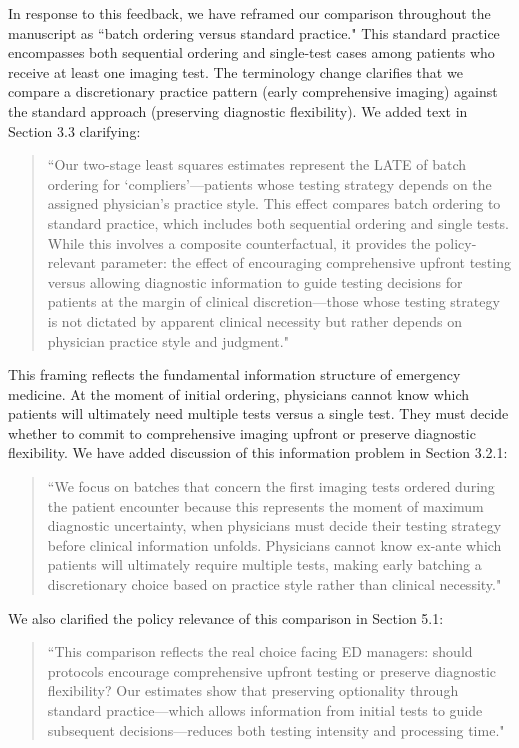 \documentclass[11pt]{article}
\newcommand{\1}{\hbox{\rm 1\kern-.35em 1}}
\begin{document}
{In response to this feedback, we have reframed our comparison throughout the manuscript as ``batch ordering versus standard practice." This standard practice encompasses both sequential ordering and single-test cases among patients who receive at least one imaging test. The terminology change clarifies that we compare a discretionary practice pattern (early comprehensive imaging) against the standard approach (preserving diagnostic flexibility). We added text in Section 3.3 clarifying:

\begin{quote}
``Our two-stage least squares estimates represent the LATE of batch ordering for `compliers'---patients whose testing strategy depends on the assigned physician's practice style. This effect compares batch ordering to standard practice, which includes both sequential ordering and single tests. While this involves a composite counterfactual, it provides the policy-relevant parameter: the effect of encouraging comprehensive upfront testing versus allowing diagnostic information to guide testing decisions for patients at the margin of clinical discretion—those whose testing strategy is not dictated by apparent clinical necessity but rather depends on physician practice style and judgment."
\end{quote}

This framing reflects the fundamental information structure of emergency medicine. At the moment of initial ordering, physicians cannot know which patients will ultimately need multiple tests versus a single test. They must decide whether to commit to comprehensive imaging upfront or preserve diagnostic flexibility. We have added discussion of this information problem in Section 3.2.1:

\begin{quote}
``We focus on batches that concern the first imaging tests ordered during the patient encounter because this represents the moment of maximum diagnostic uncertainty, when physicians must decide their testing strategy before clinical information unfolds. Physicians cannot know ex-ante which patients will ultimately require multiple tests, making early batching a discretionary choice based on practice style rather than clinical necessity."
\end{quote}

We also clarified the policy relevance of this comparison in Section 5.1:

\begin{quote}
``This comparison reflects the real choice facing ED managers: should protocols encourage comprehensive upfront testing or preserve diagnostic flexibility? Our estimates show that preserving optionality through standard practice---which allows information from initial tests to guide subsequent decisions---reduces both testing intensity and processing time."
\end{quote}

}
\end{document}
